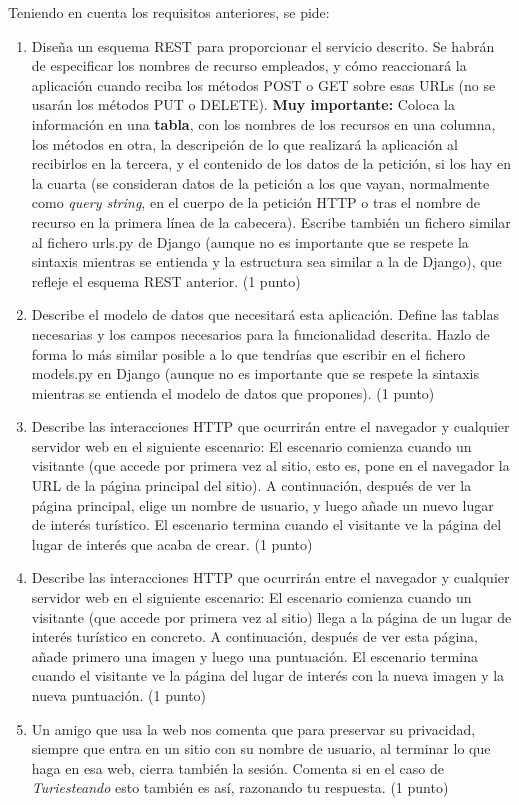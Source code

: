 \newpage

Teniendo en cuenta los requisitos anteriores, se pide:

\begin{enumerate}
    \item Diseña un esquema REST para proporcionar el servicio descrito. Se habrán de especificar los nombres de recurso empleados, y cómo reaccionará la aplicación cuando reciba los métodos POST o GET sobre esas URLs (no se usarán los métodos PUT o DELETE). \textbf{Muy importante:} Coloca la información en una \textbf{tabla}, con los nombres de los recursos en una columna, los métodos en otra, la descripción de lo que realizará la aplicación al recibirlos en la tercera, y el contenido de los datos de la petición, si los hay en la cuarta (se consideran datos de la petición a los que vayan, normalmente como \emph{query string}, en el cuerpo de la petición HTTP o tras el nombre de recurso en la primera línea de la cabecera). Escribe también un fichero similar al fichero urls.py de Django (aunque no es importante que se respete la sintaxis mientras se entienda y la estructura sea similar a la de Django), que refleje el esquema REST anterior. (1 punto)

    \item Describe el modelo de datos que necesitará esta aplicación. Define las tablas necesarias y los campos necesarios para la funcionalidad descrita. Hazlo de forma lo más similar posible a lo que tendrías que escribir en el fichero models.py en Django (aunque no es importante que se respete la sintaxis mientras se entienda el modelo de datos que propones). (1 punto)

    \item Describe las interacciones HTTP que ocurrirán entre el navegador y cualquier servidor web en el siguiente escenario: El escenario comienza cuando un visitante (que accede por primera vez al sitio, esto es, pone en el navegador la URL de la página principal del sitio). A continuación, después de ver la página principal, elige un nombre de usuario, y luego añade un nuevo lugar de interés turístico. El escenario termina cuando el visitante ve la página del lugar de interés que acaba de crear. (1 punto)

    \item Describe las interacciones HTTP que ocurrirán entre el navegador y cualquier servidor web en el siguiente escenario: El escenario comienza cuando un visitante (que accede por primera vez al sitio) llega a la página de un lugar de interés turístico en concreto. A continuación, después de ver esta página, añade primero una imagen y luego una puntuación. El escenario termina cuando el visitante ve la página del lugar de interés con la nueva imagen y la nueva puntuación. (1 punto)

    \item Un amigo que usa la web nos comenta que para preservar su privacidad, siempre que entra en un sitio con su nombre de usuario, al terminar lo que haga en esa web, cierra también la sesión. Comenta si en el caso de \emph{Turiesteando} esto también es así, razonando tu respuesta. (1 punto)

\end{enumerate}

